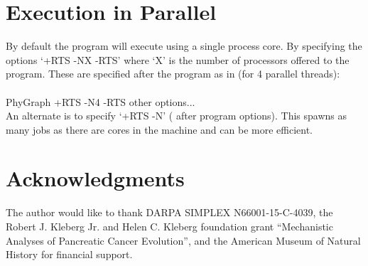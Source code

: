 \documentclass[11pt]{article}
\begin{document}
	\section{Execution in Parallel}
	By default the program will execute using a single process core.  By specifying the options `+RTS -NX -RTS' where `X' is the number of processors offered to the program. These are specified after the program as in (for 4 parallel threads):\\
	\\
	PhyGraph +RTS -N4 -RTS other options...  \\
	
	An alternate is to specify `+RTS -N' ( after program options).  This spawns as many jobs as there are cores in the machine and can be more efficient.
	
	\section*{Acknowledgments}
	The author would like to thank DARPA SIMPLEX N66001-15-C-4039, the  Robert J. Kleberg Jr. and Helen C. Kleberg foundation grant ``Mechanistic Analyses of Pancreatic Cancer Evolution'', and the American Museum of Natural History for financial support.  
	
	\newpage
	
\end{document}
